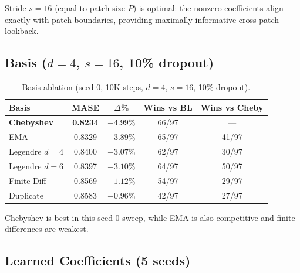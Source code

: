 \documentclass{article}
\begin{document}
Stride $s=16$ (equal to patch size $P$) is optimal: the nonzero coefficients align exactly with patch boundaries, providing maximally informative cross-patch lookback.

\subsection{Basis ($d=4$, $s=16$, 10\% dropout)}

\begin{table}[H]
\centering
\caption{Basis ablation (seed 0, 10K steps, $d=4$, $s=16$, 10\% dropout).}
\small
\begin{tabular}{lcccc}
\toprule
\textbf{Basis} & \textbf{MASE} & \textbf{$\Delta$\%} & \textbf{Wins vs BL} & \textbf{Wins vs Cheby} \\
\midrule
\textbf{Chebyshev} & \textbf{0.8234} & $\mathbf{-4.99\%}$ & 66/97 & --- \\
EMA & 0.8329 & $-3.89\%$ & 65/97 & 41/97 \\
Legendre $d=4$ & 0.8400 & $-3.07\%$ & 62/97 & 30/97 \\
Legendre $d=6$ & 0.8397 & $-3.10\%$ & 64/97 & 50/97 \\
Finite Diff & 0.8569 & $-1.12\%$ & 54/97 & 29/97 \\
Duplicate & 0.8583 & $-0.96\%$ & 42/97 & 27/97 \\
\bottomrule
\end{tabular}
\end{table}

Chebyshev is best in this seed-0 sweep, while EMA is also competitive and finite differences are weakest.

\subsection{Learned Coefficients (5 seeds)}
\end{document}
